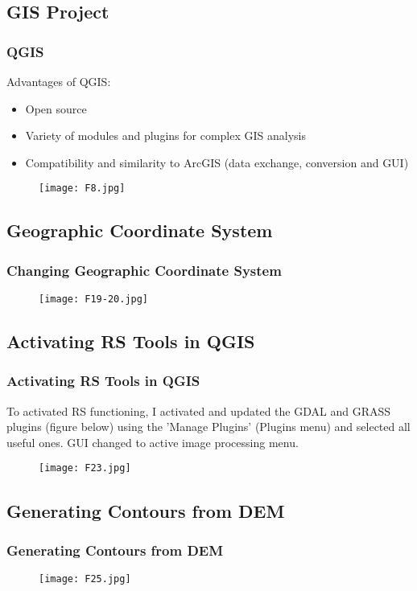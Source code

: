 \documentclass[pdflatex,compress,8pt,
	xcolor={dvipsnames,dvipsnames,svgnames,x11names,table},
	hyperref={
	breaklinks = true, 
	pdfauthor={Lemenkova Polina}, 
	pdfsubject={Preentation}, 
	pdfcreator={Lemenkova Polina}, 
	pdfproducer={Lemenkova Polina}, 
	colorlinks=true,linkcolor=blue, 
	citecolor=NavyBlue, 
	urlcolor = NavyBlue, 
	breaklinks = true}]{beamer}
\begin{document}
\subsection{GIS Project}
\begin{frame}\frametitle{QGIS}
Advantages of QGIS:
\begin{itemize}
	\item Open source
	\item Variety of modules and plugins for complex GIS analysis
	\item Compatibility and similarity to ArcGIS (data exchange, conversion and GUI) 
\end{itemize}

\begin{figure}[H]
	\centering
		\texttt{[image: F8.jpg]}
\end{figure}

\end{frame}

\subsection{Geographic Coordinate System}
\begin{frame}\frametitle{Changing Geographic Coordinate System}
\begin{figure}[H]
	\centering
		\texttt{[image: F19-20.jpg]}
\end{figure}
\end{frame}

\subsection{Activating RS Tools in QGIS}
\begin{frame}\frametitle{Activating RS Tools in QGIS}
To activated RS functioning, I activated and updated the GDAL and GRASS plugins (figure below) using the 'Manage Plugins' (Plugins menu) and selected all useful ones. GUI changed to active image processing menu.
\begin{figure}[H]
	\centering
		\texttt{[image: F23.jpg]}
\end{figure}
\end{frame}

\subsection{Generating Contours from DEM}
\begin{frame}\frametitle{Generating Contours from DEM} 
\begin{figure}[H]
	\centering
		\texttt{[image: F25.jpg]}
\end{figure}
\end{frame}
\end{document}
